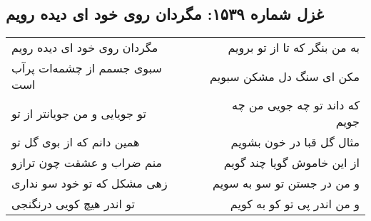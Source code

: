\begin{center}
\section*{غزل شماره ۱۵۳۹: مگردان روی خود ای دیده رویم}
\label{sec:1539}
\begin{longtable}{l p{0.5cm} r}
مگردان روی خود ای دیده رویم
&&
به من بنگر که تا از تو برویم
\\
سبوی جسمم از چشمه‌ات پرآب است
&&
مکن ای سنگ دل مشکن سبویم
\\
تو جویایی و من جویانتر از تو
&&
که داند تو چه جویی من چه جویم
\\
همین دانم که از بوی گل تو
&&
مثال گل قبا در خون بشویم
\\
منم ضراب و عشقت چون ترازو
&&
از این خاموش گویا چند گویم
\\
زهی مشکل که تو خود سو نداری
&&
و من در جستن تو سو به سویم
\\
تو اندر هیچ کویی درنگنجی
&&
و من اندر پی تو کو به کویم
\\
\end{longtable}
\end{center}
